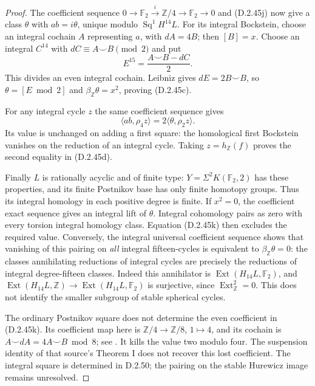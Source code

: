 \begin{proof}
The coefficient sequence
$0\to\mathbb F_2\xrightarrow{i}\mathbb Z/4\to\mathbb F_2\to0$
and (D.2.45j) now give a class $\theta$ with $ab=i\theta$,
unique modulo $\operatorname{Sq}^1H^{14}L$.
For its integral Bockstein, choose an integral cochain
$A$ representing $a$, with $dA=4B$; then $[B]=x$.
Choose an integral $C^{14}$ with
$dC\equiv A\smile B\pmod2$ and put
\[
 E^{15}=\frac{A\smile B-dC}{2}.
\]
This divides an even integral cochain.  Leibniz gives
$dE=2B\smile B$, so $\theta=[E\bmod2]$ and
$\beta_{\mathbb Z}\theta=x^2$, proving (D.2.45c).

For any integral cycle $z$ the same coefficient sequence gives
\[
                  \langle ab,\rho_4z\rangle
                      =2\langle\theta,\rho_2z\rangle.
 \tag{D.2.45k}
\]
Its value is unchanged on adding a first square: the
homological first Bockstein vanishes on the reduction of
an integral cycle.  Taking $z=h_{\mathbb Z}(f)$ proves
the second equality in (D.2.45d).

Finally $L$ is rationally acyclic and of finite type:
$Y=\Sigma^2K(\mathbb F_2,2)$ has these properties, and
its finite Postnikov base has only finite homotopy groups.
Thus its integral homology in each positive degree is finite.
If $x^2=0$, the coefficient exact sequence gives an
integral lift of $\theta$.  Integral cohomology pairs as
zero with every torsion integral homology class.  Equation
(D.2.45k) then excludes the required value.  Conversely,
the integral universal coefficient sequence shows that
vanishing of this pairing on \emph{all} integral
fifteen-cycles is equivalent to $\beta_{\mathbb Z}\theta=0$:
the classes annihilating reductions of integral cycles
are precisely the reductions of integral degree-fifteen
classes.  Indeed this annihilator is
$\operatorname{Ext}(H_{14}L,\mathbb F_2)$, and
$\operatorname{Ext}(H_{14}L,\mathbb Z)\to
\operatorname{Ext}(H_{14}L,\mathbb F_2)$ is surjective,
since $\operatorname{Ext}_{\mathbb Z}^2=0$.
This does not identify the smaller subgroup
of stable spherical cycles.

The ordinary Postnikov square does not determine the even
coefficient in (D.2.45k).  Its coefficient map here is
$\mathbb Z/4\to\mathbb Z/8$, $1\mapsto4$, and its
cochain is $A\smile dA=4A\smile B\bmod8$;
see \cite[\S2, formula (2.1), p.~899]{Thomas1959Pontrjagin}.
It kills the value two modulo four.  The suspension identity
of that source's Theorem I does not recover this lost
coefficient. The integral square is determined in D.2.50;
the pairing on the stable Hurewicz image remains unresolved.
\end{proof}
